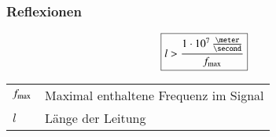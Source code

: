 \subsubsection{Reflexionen}

\begin{minipage}[c]{0.3\columnwidth}
    $$ \boxed{ l > \frac{1 \cdot 10^7 \, \frac{\meter}{\second} }{f_{\rm max}} } $$
\end{minipage}\hfill
\begin{minipage}[c]{0.68\columnwidth}
    \begin{tabular}{ll}
        $f_{\rm max}$   & Maximal enthaltene Frequenz im Signal \\
        $l$         & Länge der Leitung 
    \end{tabular}
\end{minipage}

